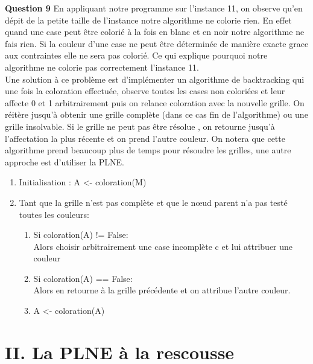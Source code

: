 \documentclass[a4paper]{memoir}
\begin{document}
\textbf{Question 9} En appliquant notre programme sur l'instance 11, on observe qu'en dépit de la petite taille de l'instance notre algorithme ne colorie rien. En effet quand une case peut être colorié à la fois en blanc et en noir notre algorithme ne fais rien. Si la couleur d'une case ne peut être déterminée de manière exacte grace aux contraintes elle ne sera pas colorié. Ce qui explique pourquoi notre algorithme ne colorie pas correctement l'instance 11.
\\
Une solution à ce problème est d'implémenter un algorithme de backtracking qui une fois la coloration effectuée, observe toutes les cases non coloriées et leur affecte 0 et 1 arbitrairement puis on relance coloration avec la nouvelle grille. On réitère jusqu'à obtenir une grille complète (dans ce cas fin de l'algorithme) ou une grille insolvable. Si le grille ne peut pas être résolue , on retourne jusqu'à l'affectation la plus récente et on prend l'autre couleur. On notera que cette algorithme prend beaucoup plus de temps pour résoudre les grilles, une autre approche est d'utiliser la PLNE.\\
\begin{enumerate}
\item Initialisation : A <- coloration(M) 
\item Tant que la grille n'est pas complète et que le nœud parent n'a pas testé toutes les couleurs:
  \begin{enumerate}
    \item Si coloration(A) != False:\\
      Alors choisir arbitrairement une case incomplète c et lui attribuer une couleur
    \item Si coloration(A) == False:\\
      Alors en retourne à la grille précédente et on attribue l'autre couleur.
    \item  A <- coloration(A)
  \end{enumerate}
\end{enumerate}



 	
 	\newpage
 	\section{II. La PLNE à la rescousse}
\end{document}
